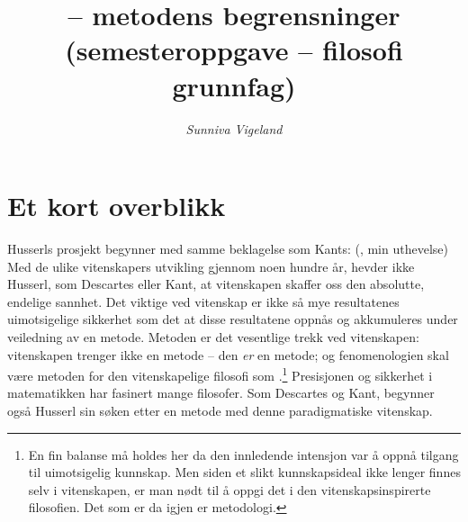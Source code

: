 \renewcommand{\baselinestretch}{1.5}



\title{  -- metodens begrensninger \\
{\normalsize{(semesteroppgave -- filosofi grunnfag)}}}
\author{{\em Sunniva Vigeland} }

\date{}%
\maketitle 


\section{Et kort overblikk}\label{sec:over}
Husserls prosjekt begynner med samme beklagelse som Kants:
 (\cite{RS}, min uthevelse) Med 
 de ulike vitenskapers utvikling 
gjennom noen hundre {\aa}r, hevder ikke Husserl, som Descartes eller 
Kant, at vitenskapen skaffer oss den absolutte, endelige sannhet. Det 
viktige ved vitenskap er ikke s{\aa} mye resultatenes 
uimotsigelige sikkerhet som det at disse resultatene oppn{\aa}s 
og akkumuleres under veiledning av en metode. Metoden er det 
vesentlige trekk ved vitenskapen: vitenskapen trenger ikke en metode 
-- den {\em er} en metode; og fenomenologien skal v{\ae}re metoden 
for den vitenskapelige filosofi som .\footnote{En fin balanse m{\aa} holdes her da den innledende 
intensjon var {\aa} oppn{\aa} tilgang til uimotsigelig kunnskap. Men 
siden et slikt kunnskapsideal ikke lenger finnes selv i 
vitenskapen, er man n{\o}dt til {\aa} oppgi det i den 
vitenskapsinspirerte filosofien. Det som er da igjen er metodologi.} 
Presisjonen og sikkerhet i matematikken har fasinert mange filosofer. 
Som Descartes og Kant, begynner ogs{\aa} Husserl sin s{\o}ken etter 
en metode med denne paradigmatiske vitenskap.

